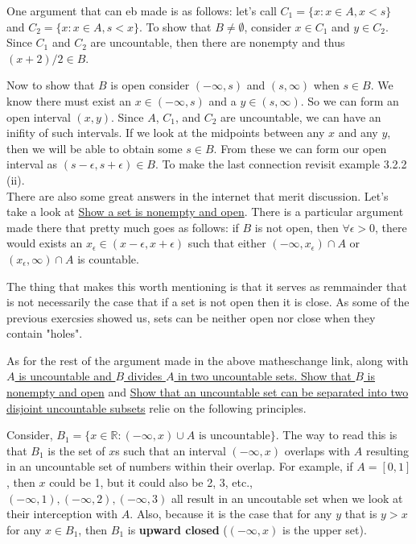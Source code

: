 One argument that can eb made is as follows: let's call $C_1 = \{ x : x \in A, x < s \}$
and $C_2 = \{ x : x \in A,  s < x \}$.
To show that $B \neq \emptyset$, consider $x \in C_1$ and $y\in C_2$. Since $C_1$ and $C_2$
are uncountable, then there are nonempty and thus $(x+2)/2 \in B$.

Now to show that $B$ is open consider $(-\infty, s)$ and $(s, \infty)$ when $s\in B$.
We know there must exist an $x \in (-\infty , s)$ and a $y \in (s, \infty)$.
So we can form an open interval $(x,y)$.
Since $A$, $C_1$, and $C_2$ are uncountable, we can have an inifity of such intervals.
If we look at the midpoints between any $x$ and any $y$, then we will be able to obtain some $s \in B$.
From these we can form our open interval as $(s-\epsilon , s+\epsilon) \in B$.
To make the last connection revisit example 3.2.2 (ii).
\\

There are also some great answers in the internet that merit discussion.
Let's take a look at
\href{https://math.stackexchange.com/questions/3042397/show-a-set-is-nonempty-and-open}{Show a set is nonempty and open}.
There is a particular argument made there that pretty much goes as follows: if $B$ is not open, then
$\forall \epsilon >0$, there would exists an $x_\epsilon \in (x-\epsilon , x+\epsilon)$ such that
either $(-\infty , x_\epsilon) \cap A$ or $(x_\epsilon , \infty) \cap A$ is countable.

The thing that makes this worth mentioning is that it serves as remmainder that is not necessarily the case that if
a set is not open then it is close.
As some of the previous exercsies showed us, sets can be neither open nor close when they contain "holes".

As for the rest of the argument made in the above matheschange link, along with
\href{https://math.stackexchange.com/questions/1800147/a-is-uncountable-and-b-divides-a-in-two-uncountable-sets-show-that-b-is}{$A$
is uncountable and $B$ divides $A$ in two uncountable sets. Show that $B$ is nonempty and open}
and
\href{https://math.stackexchange.com/questions/4071927/show-that-an-uncountable-set-can-be-separated-into-two-disjoint-uncountable-subs}{
    Show that an uncountable set can be separated into two disjoint uncountable subsets}
relie on the following principles.

Consider, $B_1 = \{ x\in\mathbb{R} : (-\infty,x) \cup A \text{ is uncountable} \}$.
The way to read this is that $B_1$ is the set of $x$s such that an interval $(-\infty,x)$ overlaps with $A$ resulting in an uncountable set of numbers within their overlap.
For example, if $A = [0,1]$, then $x$ could be 1, but it could also be 2, 3, etc., $(-\infty,1), (-\infty, 2), (-\infty,3)$ all result
in an uncoutable set when we look at their interception with $A$.
Also, because it is the case that for any $y$ that is $y > x$ for any $x \in B_1$, then $B_1$ is \textbf{upward closed} ($(-\infty,x)$ is the upper set).

